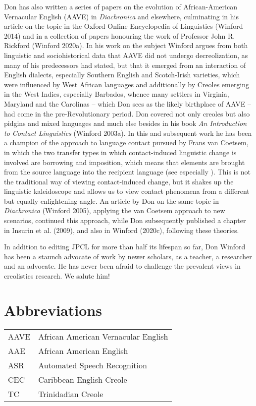 \documentclass[output=paper, colorlinks,citecolor=brown]{langscibook}
\begin{document}
Don has also written a series of papers on the evolution of  African-American Vernacular English (AAVE) in \textit{Diachronica} and elsewhere, culminating in his article on the topic in the Oxford Online Encyclopedia of Linguistics (Winford 2014) and in a collection of papers honouring the work of Professor John R. Rickford (Winford 2020a).  In his work on the subject Winford argues from both linguistic and sociohistorical data that AAVE did not undergo decreolization, as many of his predecessors had stated, but that it emerged from an interaction of English dialects, especially Southern English and Scotch-Irish varieties, which were influenced by West African languages and additionally by Creoles emerging in the West Indies, especially Barbados, whence many settlers in Virginia, Maryland  and the Carolinas – which Don sees as the likely birthplace of AAVE – had come in the pre-Revolutionary period. Don covered not only creoles but also pidgins and mixed languages and much else besides in his book \textit{An Introduction to Contact Linguistics}  (Winford 2003a).  In this and subsequent work he has been a champion of the approach to language contact pursued by Frans van Coetsem, in which the two transfer types in which contact-induced linguistic change is involved are borrowing and imposition, which means that elements are brought from the source language into the recipient language (see especially \citet{vancoetsem1988}).    This is not the traditional way of viewing contact-induced change, but it shakes up the linguistic kaleidoscope and allows us to view contact phenomena from a different but equally enlightening angle. An article by Don on the same topic in \textit{Diachronica} (Winford 2005), applying the van Coetsem approach to new scenarios,  continued this approach, while Don subsequently published a chapter in Insurin et al. (2009), and also in  Winford (2020c), following these theories.

In addition to editing JPCL for more than half its lifespan so far, Don Winford has been a staunch advocate of work by newer scholars, as a teacher, a researcher and an advocate. He has never been afraid to challenge the prevalent views in creolistics research. We salute him!




\section*{Abbreviations}

\begin{tabular}{@{}ll@{}}
AAVE & African American Vernacular English  \\
AAE  & African American English\\
ASR  & Automated Speech Recognition \\
CEC  & Caribbean English Creole \\
TC   & Trinidadian Creole\\
\end{tabular}
\end{document}
